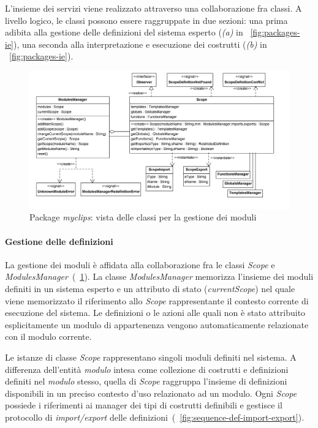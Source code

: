 L'insieme dei servizi viene realizzato attraverso una collaborazione fra classi. A livello logico, le classi possono essere raggruppate in due sezioni: una prima adibita alla gestione delle definizioni del sistema esperto (\emph{(a)} in \figurename~\ref{fig:packages-ie}), una seconda alla interpretazione e esecuzione dei costrutti (\emph{(b)} in \figurename~\ref{fig:packages-ie}).

\begin{figure}[h]
\centering
\includegraphics[width=1\textwidth]{Immagini/Capitolo3/Classi/myclips_Scope-ModulesManager.png}
\caption{Package \emph{myclips}: vista delle classi per la gestione dei moduli}\label{fig:class-myclips-scope-mm}
\end{figure}

\paragraph{Gestione delle definizioni}

La gestione dei moduli è affidata alla collaborazione fra le classi \emph{Scope} e \emph{ModulesManager}~(\figurename~\ref{fig:class-myclips-scope-mm}).
La classe \emph{ModulesManager} memorizza l'insieme dei moduli definiti in un sistema esperto e un attributo di stato (\emph{currentScope}) nel quale viene memorizzato il riferimento allo \emph{Scope} rappresentante il contesto corrente di esecuzione del sistema. Le definizioni o le azioni alle quali non è stato attribuito esplicitamente un modulo di appartenenza vengono automaticamente relazionate con il modulo corrente.

Le istanze di classe \emph{Scope} rappresentano singoli moduli definiti nel sistema. A differenza dell'entità \emph{modulo} intesa come collezione di costrutti e definizioni definiti nel \emph{modulo} stesso, quella di \emph{Scope} raggruppa l'insieme di definizioni disponibili in un preciso contesto d'uso relazionato ad un modulo. Ogni \emph{Scope} possiede i riferimenti ai manager dei tipi di costrutti definibili e gestisce il protocollo di \emph{import/export} delle definizioni~(\figurename~\ref{fig:sequence-def-import-export}).

